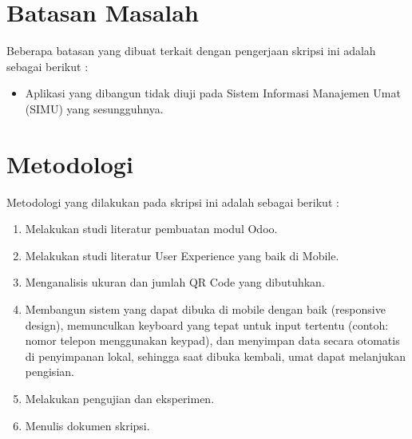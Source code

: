 \section{Batasan Masalah}
\label{sec:batasan}
Beberapa batasan yang dibuat terkait dengan pengerjaan skripsi ini adalah sebagai berikut :
\begin{itemize}
	\item Aplikasi yang dibangun tidak diuji pada Sistem Informasi Manajemen Umat (SIMU) yang sesungguhnya.
\end{itemize}


\section{Metodologi}
\label{sec:metlit}
Metodologi yang dilakukan pada skripsi ini adalah sebagai berikut :
\begin{enumerate}
	\item Melakukan studi literatur pembuatan modul Odoo.
	\item Melakukan studi literatur User Experience yang baik di Mobile.
	\item Menganalisis ukuran dan jumlah QR Code yang dibutuhkan.
	\item Membangun sistem yang dapat dibuka di mobile dengan baik (responsive design), memunculkan keyboard yang tepat untuk input tertentu (contoh: nomor telepon menggunakan keypad), dan menyimpan data secara otomatis di penyimpanan lokal, sehingga saat dibuka kembali, umat dapat melanjukan pengisian.
	\item Melakukan pengujian dan eksperimen.
	\item Menulis dokumen skripsi.
\end{enumerate}


